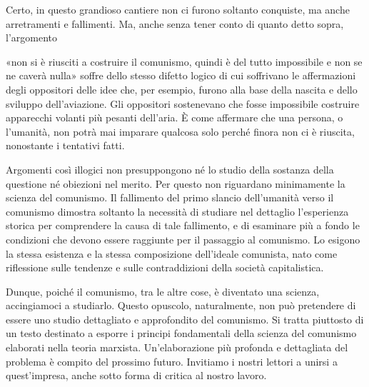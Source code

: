 \documentclass[../main]{subfiles}
\begin{document}
Certo, in questo grandioso cantiere non ci furono soltanto conquiste, ma anche arretramenti e fallimenti. Ma, anche senza tener conto di quanto detto sopra, l'argomento

«non si è riusciti a costruire il comunismo, quindi è del tutto impossibile e non se ne caverà nulla» soffre dello stesso difetto logico di cui soffrivano le affermazioni degli oppositori delle idee che, per esempio, furono alla base della nascita e dello sviluppo dell'aviazione. Gli oppositori sostenevano che fosse impossibile costruire apparecchi volanti più pesanti dell'aria. È come affermare che una persona, o l'umanità, non potrà mai imparare qualcosa solo perché finora non ci è riuscita, nonostante i tentativi fatti.

Argomenti così illogici non presuppongono né lo studio della sostanza della questione né obiezioni nel merito. Per questo non riguardano minimamente la scienza del comunismo. Il fallimento del primo slancio dell'umanità verso il comunismo dimostra soltanto la necessità di studiare nel dettaglio l'esperienza storica per comprendere la causa di tale fallimento, e di esaminare più a fondo le condizioni che devono essere raggiunte per il passaggio al comunismo. Lo esigono la stessa esistenza e la stessa composizione dell'ideale comunista, nato come riflessione sulle tendenze e sulle contraddizioni della società capitalistica.

Dunque, poiché il comunismo, tra le altre cose, è diventato una scienza, accingiamoci a studiarlo. Questo opuscolo, naturalmente, non può pretendere di essere uno studio dettagliato e approfondito del comunismo. Si tratta piuttosto di un testo destinato a esporre i principi fondamentali della scienza del comunismo elaborati nella teoria marxista. Un'elaborazione più profonda e dettagliata del problema è compito del prossimo futuro. Invitiamo i nostri lettori a unirsi a quest'impresa, anche sotto forma di critica al nostro lavoro.
\end{document}
